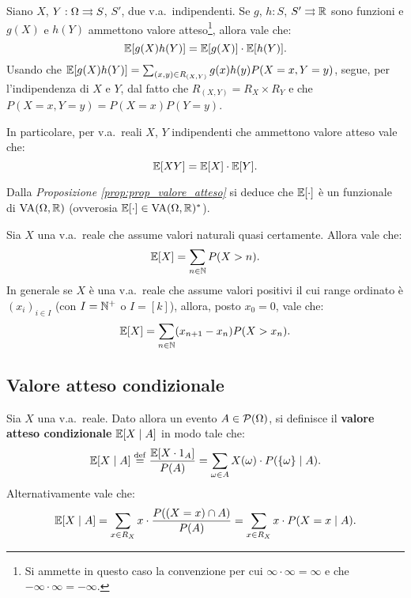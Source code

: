 \begin{multicols*}{2}
\begin{proposition}
    Siano $X$, $Y : \Omega \rightrightarrows S$, $S'$, due v.a.~indipendenti. Se $g$, $h : S$, $S' \rightrightarrows \mathbb{R}$ sono funzioni e $g(X)$ e $h(Y)$ ammettono valore atteso\footnote{
        Si ammette in questo caso la convenzione per cui $\infty \cdot \infty = \infty$ e
        che $-\infty \cdot \infty = -\infty$.
    }, allora vale che:
    \[
        \mathbb{E}[g(X)h(Y)] = \mathbb{E}[g(X)] \cdot \mathbb{E}[h(Y)].
    \]
    Usando che $\mathbb{E}[g(X)h(Y)] = \sum_{(x, y) \in R_{(X, Y)}} g(x) h(y) P(X = x, Y = y)$, segue, per
    l'indipendenza di $X$ e $Y$, dal fatto che $R_{(X, Y)} = R_X \times R_Y$ e che $P(X = x, Y = y) = P(X = x) P(Y = y)$.
\end{proposition}

\begin{remark}
    \label{remark:indipendenza_valore_atteso}
    In particolare, per v.a.~reali $X$, $Y$ indipendenti che ammettono valore atteso
    vale che:
    \[
        \mathbb{E}[XY] = \mathbb{E}[X] \cdot \mathbb{E}[Y].
    \]
\end{remark}

\begin{remark}
    Dalla \textit{Proposizione \ref{prop:prop_valore_atteso}} si deduce che
    $\mathbb{E}[\cdot]$ è un funzionale di $\operatorname{VA}(\Omega, \mathbb{R})$ (ovverosia
    $\mathbb{E}[\cdot] \in \operatorname{VA}(\Omega, \mathbb{R})^*$).
\end{remark}

\begin{proposition}
    Sia $X$ una v.a.~reale che assume valori naturali quasi certamente.
    Allora vale che:
    \[
        \mathbb{E}[X] = \sum_{n \in \mathbb{N}} P(X > n).
    \]
    In generale se $X$ è una v.a.~reale che assume valori positivi il cui
    range ordinato è $(x_i)_{i \in I}$ (con $I = \mathbb{N}^+$ o $I = [k]$),
    allora, posto $x_0 = 0$, vale che:
    \[
        \mathbb{E}[X] = \sum_{n \in \mathbb{N}} (x_{n+1} - x_n) P(X > x_n).
    \]
\end{proposition}

\subsection{Valore atteso condizionale}

\begin{definition}
    Sia $X$ una v.a.~reale. Dato allora un evento
    $A \in \mathcal{P}(\Omega)$, si definisce il \textbf{valore atteso
    condizionale} $\mathbb{E}[X \mid A]$ in modo tale che:
    \[
        \mathbb{E}[X \mid A] \overset{\mathrm{def}}{=} \frac{\mathbb{E}[X \cdot 1_A]}{P(A)} = \sum_{\omega \in A} X(\omega) \cdot P(\{\omega\} \mid A).
    \]
    Alternativamente vale che:
    \[
        \mathbb{E}[X \mid A] = \sum_{x \in R_X} x \cdot \frac{P((X = x) \cap A)}{P(A)} = \sum_{x \in R_X} x \cdot P(X=x \mid A).
    \]
\end{definition}


\end{multicols*}

